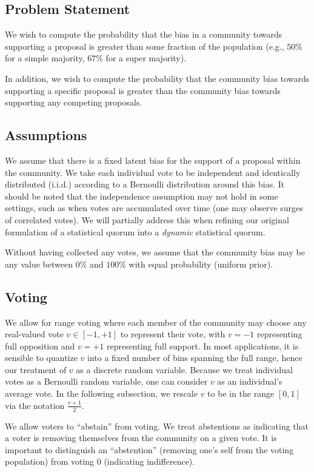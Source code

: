 \documentclass[format=acmsmall, review=true, screen=true, anonymous=true]{acmart}
\begin{document}
\subsection{Problem Statement}
We wish to compute the probability that the bias in a community towards supporting a
proposal is greater than some fraction of the population (e.g., $50\%$ for a simple majority,
$67\%$ for a super majority).

In addition, we wish to compute the probability that the community bias towards supporting
a specific proposal is greater than the community bias towards supporting any competing proposals.

\subsection{Assumptions}
We assume that there is a fixed latent bias for the support of a proposal within the community.
We take each individual vote to be independent and identically distributed (i.i.d.) according
to a Bernoulli distribution around this bias.
It should be noted that the independence assumption may not hold in some settings, such as when
votes are accumulated over time (one may observe surges of correlated votes).
We will partially address this when refining our original formulation of a statistical quorum
into a \textit{dynamic} statistical quorum.

Without having collected any votes, we assume that the community bias may be any value between
$0\%$ and $100\%$ with equal probability (uniform prior).

\subsection{Voting}
We allow for range voting where each member of the community may choose any real-valued vote
$v \in [-1,+1]$ to represent their vote, with $v = -1$ representing full opposition and $v=+1$
representing full support.
In most applications, it is sensible to quantize $v$ into a fixed number of bins spanning
the full range, hence our treatment of $v$ as a discrete random variable.
Because we treat individual votes as a Bernoulli random variable, one can consider $v$ as
an individual's average vote.
In the following subsection, we rescale $v$ to be in the range $[0,1]$ via the
notation $\frac{v + 1}{2}$.

We allow voters to ``abstain'' from voting.
We treat abstentions as indicating that a voter is removing themselves from the community on a
given vote.
It is important to distinguish an ``abstention'' (removing one's self from the voting population)
from voting $0$ (indicating indifference).
\end{document}
